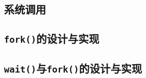 \subsection{系统调用}

\subsection{\texttt{fork()}的设计与实现}

\subsection{\texttt{wait()}与\texttt{fork()}的设计与实现}